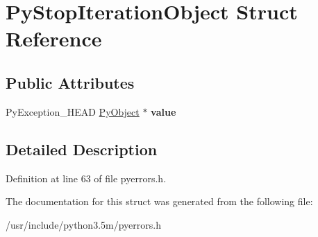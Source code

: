 \hypertarget{structPyStopIterationObject}{}\section{Py\+Stop\+Iteration\+Object Struct Reference}
\label{structPyStopIterationObject}
\subsection*{Public Attributes}
\begin{DoxyCompactItemize}
\item 
Py\+Exception\+\_\+\+H\+E\+AD \hyperlink{struct__object}{Py\+Object} $\ast$ {\bfseries value}\hypertarget{structPyStopIterationObject_ae477f16a05c1c6e648292212979fbe83}{}\label{structPyStopIterationObject_ae477f16a05c1c6e648292212979fbe83}

\end{DoxyCompactItemize}


\subsection{Detailed Description}


Definition at line 63 of file pyerrors.\+h.



The documentation for this struct was generated from the following file\+:\begin{DoxyCompactItemize}
\item 
/usr/include/python3.\+5m/pyerrors.\+h\end{DoxyCompactItemize}
